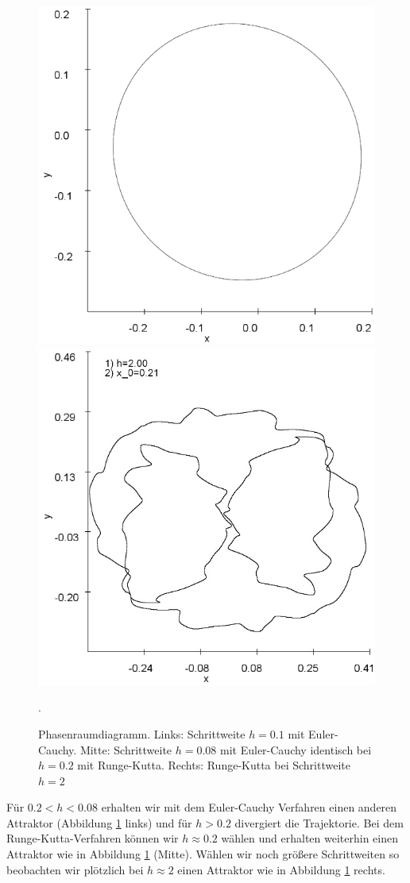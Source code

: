 \documentclass[12pt,a4paper]{article}
\begin{document}
\begin{figure}[!htbp]
\includegraphics[scale=0.28]{duffing-awp1-500k-nach-500k-h0,08-euler}
\includegraphics[scale=0.28]{duffing-awp1-h2-runge-kutta}
\caption{Phasenraumdiagramm. Links: Schrittweite $h=0.1$ mit Euler-Cauchy. Mitte: Schrittweite $h=0.08$ mit Euler-Cauchy identisch bei $h=0.2$ mit Runge-Kutta. Rechts: Runge-Kutta bei Schrittweite $h=2$}. 
\label{fig:duffing-awp1}
\end{figure}
Für $0.2<h<0.08$ erhalten wir mit dem Euler-Cauchy Verfahren einen anderen Attraktor (Abbildung \ref{fig:duffing-awp1} links) und für $h>0.2$ divergiert die Trajektorie. Bei dem Runge-Kutta-Verfahren können wir $h \approx 0.2$ wählen und erhalten weiterhin einen Attraktor wie in Abbildung \ref{fig:duffing-awp1} (Mitte). Wählen wir noch größere Schrittweiten so beobachten wir plötzlich bei $h \approx 2$ einen Attraktor wie in Abbildung \ref{fig:duffing-awp1} rechts.
\end{document}
